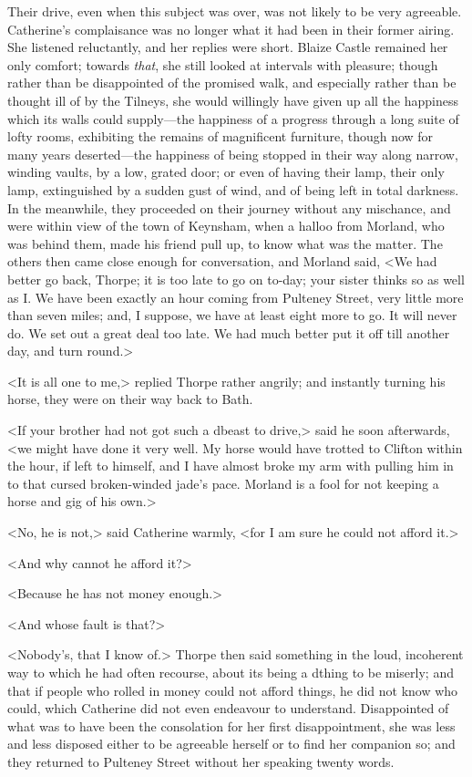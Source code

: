  Their drive, even when this subject was over, was not likely to be very agreeable. Catherine's complaisance was no longer what it had been in their former airing. She listened reluctantly, and her replies were short. Blaize Castle remained her only comfort; towards \textit{that}, she still looked at intervals with pleasure; though rather than be disappointed of the promised walk, and especially rather than be thought ill of by the Tilneys, she would willingly have given up all the happiness which its walls could supply—the happiness of a progress through a long suite of lofty rooms, exhibiting the remains of magnificent furniture, though now for many years deserted—the happiness of being stopped in their way along narrow, winding vaults, by a low, grated door; or even of having their lamp, their only lamp, extinguished by a sudden gust of wind, and of being left in total darkness. In the meanwhile, they proceeded on their journey without any mischance, and were within view of the town of Keynsham, when a halloo from Morland, who was behind them, made his friend pull up, to know what was the matter. The others then came close enough for conversation, and Morland said, <We had better go back, Thorpe; it is too late to go on to-day; your sister thinks so as well as I. We have been exactly an hour coming from Pulteney Street, very little more than seven miles; and, I suppose, we have at least eight more to go. It will never do. We set out a great deal too late. We had much better put it off till another day, and turn round.> 

 <It is all one to me,> replied Thorpe rather angrily; and instantly turning his horse, they were on their way back to Bath. 

 <If your brother had not got such a d\doubleemdash beast to drive,> said he soon afterwards, <we might have done it very well. My horse would have trotted to Clifton within the hour, if left to himself, and I have almost broke my arm with pulling him in to that cursed broken-winded jade's pace. Morland is a fool for not keeping a horse and gig of his own.> 

 <No, he is not,> said Catherine warmly, <for I am sure he could not afford it.> 

 <And why cannot he afford it?> 

 <Because he has not money enough.> 

 <And whose fault is that?> 

 <Nobody's, that I know of.> Thorpe then said something in the loud, incoherent way to which he had often recourse, about its being a d\doubleemdash thing to be miserly; and that if people who rolled in money could not afford things, he did not know who could, which Catherine did not even endeavour to understand. Disappointed of what was to have been the consolation for her first disappointment, she was less and less disposed either to be agreeable herself or to find her companion so; and they returned to Pulteney Street without her speaking twenty words. 

